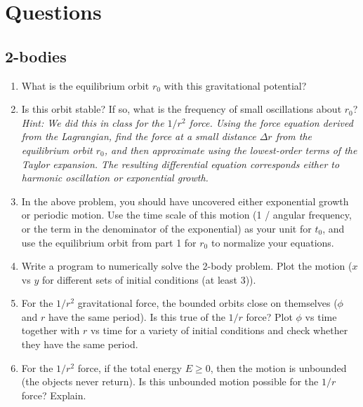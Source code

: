 \documentclass{article}
\begin{document}
\section*{Questions}
\subsection*{2-bodies}
\begin{enumerate}
	\item What is the equilibrium orbit $r_0$ with this gravitational potential?
	\item Is this orbit stable? If so, what is the frequency of small oscillations about $r_0$?\\
	\textit{Hint: We did this in class for the $1/r^2$ force. Using the force equation derived from the Lagrangian, find the force at a small distance $\Delta r$ from the equilibrium orbit $r_0$, and then approximate using the lowest-order terms of the Taylor expansion. The resulting differential equation corresponds either to harmonic oscillation or exponential growth.}
	\item In the above problem, you should have uncovered either exponential growth or periodic motion. Use the time scale of this motion (1 / angular frequency, or the term in the denominator of the exponential) as your unit for $t_0$, and use the equilibrium orbit from part 1 for $r_0$ to normalize your equations.
	\item Write a program to numerically solve the 2-body problem. Plot the motion ($x$ vs $y$ for different sets of initial conditions (at least 3)).
	\item For the $1/r^2$ gravitational force, the bounded orbits close on themselves ($\phi$ and $r$ have the same period). Is this true of the $1/r$ force? Plot $\phi$ vs time together with $r$ vs time for a variety of initial conditions and check whether they have the same period.
	\item For the $1/r^2$ force, if the total energy $E\geq0$, then the motion is unbounded (the objects never return). Is this unbounded motion possible for the $1/r$ force? Explain.
\end{enumerate}
\end{document}
